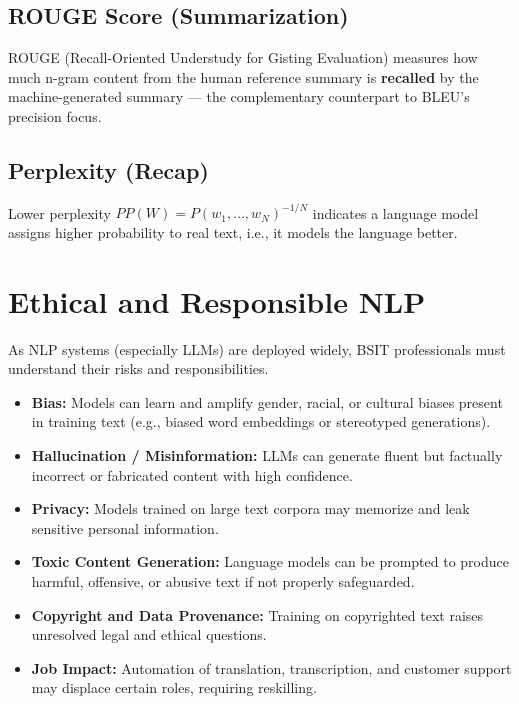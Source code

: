 \documentclass[11pt,a4paper]{article}
\begin{document}
\subsection{ROUGE Score (Summarization)}
\begin{conceptbox}[ROUGE]
ROUGE (Recall-Oriented Understudy for Gisting Evaluation) measures how much n-gram content from the human reference summary is \textbf{recalled} by the machine-generated summary --- the complementary counterpart to BLEU's precision focus.
\end{conceptbox}

\subsection{Perplexity (Recap)}
Lower perplexity $PP(W)=P(w_1,\ldots,w_N)^{-1/N}$ indicates a language model assigns higher probability to real text, i.e., it models the language better.

\section{Ethical and Responsible NLP}

\begin{alertbox}
As NLP systems (especially LLMs) are deployed widely, BSIT professionals must understand their risks and responsibilities.
\end{alertbox}

\begin{itemize}[leftmargin=*]
  \item \textbf{Bias:} Models can learn and amplify gender, racial, or cultural biases present in training text (e.g., biased word embeddings or stereotyped generations).
  \item \textbf{Hallucination / Misinformation:} LLMs can generate fluent but factually incorrect or fabricated content with high confidence.
  \item \textbf{Privacy:} Models trained on large text corpora may memorize and leak sensitive personal information.
  \item \textbf{Toxic Content Generation:} Language models can be prompted to produce harmful, offensive, or abusive text if not properly safeguarded.
  \item \textbf{Copyright and Data Provenance:} Training on copyrighted text raises unresolved legal and ethical questions.
  \item \textbf{Job Impact:} Automation of translation, transcription, and customer support may displace certain roles, requiring reskilling.
\end{itemize}
\end{document}
